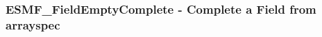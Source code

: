  
\setlength{\oldparskip}{\parskip}
\setlength{\parskip}{1.5ex}
\setlength{\oldparindent}{\parindent}
\setlength{\parindent}{0pt}
\setlength{\oldbaselineskip}{\baselineskip}
\setlength{\baselineskip}{11pt}
 
\def\bv{\begin{verbatim}}
\def\ev{\end{verbatim}}
\def\be{\begin{equation}}
\def\ee{\end{equation}}
\def\bea{\begin{eqnarray}}
\def\eea{\end{eqnarray}}
\def\bi{\begin{itemize}}
\def\ei{\end{itemize}}
\def\bn{\begin{enumerate}}
\def\en{\end{enumerate}}
\def\bd{\begin{description}}
\def\ed{\end{description}}
\def\({\left (}
\def\){\right )}
\def\[{\left [}
\def\]{\right ]}
\def\<{\left  \langle}
\def\>{\right \rangle}
\def\cI{{\cal I}}
\def\diag{\mathop{\rm diag}}
\def\tr{\mathop{\rm tr}}


 
\subsubsection [ESMF\_FieldEmptyComplete] {ESMF\_FieldEmptyComplete - Complete a Field from arrayspec}



